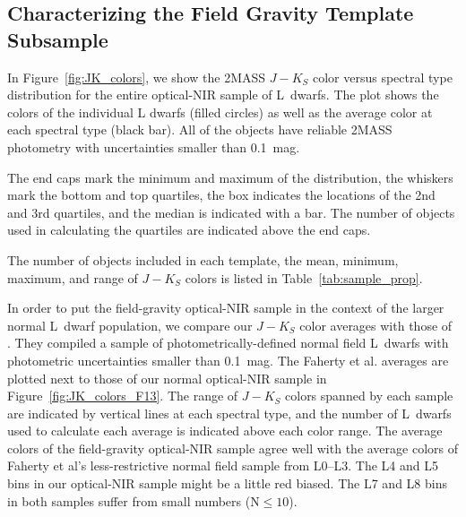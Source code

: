 \documentclass[12pt,preprint]{aastex}
\begin{document}


\subsection{Characterizing the Field Gravity Template Subsample}
\label{sec:templates_normal}

In Figure~\ref{fig:JK_colors}, we show the 2MASS $J-K_S$ color versus spectral type distribution for the entire optical-NIR sample of L~dwarfs. The plot shows the colors of the individual L dwarfs (filled circles) as well as the average color at each spectral type (black bar). All of the objects have reliable 2MASS photometry with uncertainties smaller than 0.1~mag. 

The end caps mark the minimum and maximum of the distribution, the whiskers mark the bottom and top quartiles, the box indicates the locations of the 2nd and 3rd quartiles, and the median is indicated with a bar. The number of objects used in calculating the quartiles are indicated above the end caps.

The number of objects included in each template, the mean, minimum, maximum, and range of $J-K_S$ colors is listed in Table~\ref{tab:sample_prop}. 

In order to put the field-gravity optical-NIR sample in the context of the larger normal L~dwarf population, we compare our $J-K_S$ color averages with those of \citet{Faherty13_0355}. 
They compiled a sample of photometrically-defined normal field L~dwarfs with photometric uncertainties smaller than 0.1~mag. 
The Faherty et al. averages are plotted next to those of our normal optical-NIR sample in Figure~\ref{fig:JK_colors_F13}. 
The range of $J-K_S$ colors spanned by each sample are indicated by vertical lines at each spectral type, and the number of L~dwarfs used to calculate each average is indicated above each color range. 
The average colors of the field-gravity optical-NIR sample agree well with the average colors of Faherty et al's less-restrictive normal field sample from L0--L3.
The L4 and L5 bins in our optical-NIR sample might be a little red biased.
The L7 and L8 bins in both samples suffer from small numbers (N$\le10$). 
\end{document}
